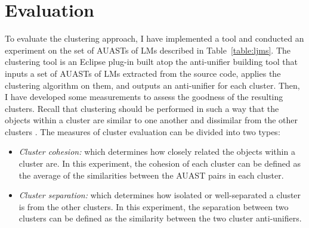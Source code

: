 \section{Evaluation} \label{evaluation}
To evaluate the clustering approach, I have implemented a tool and conducted an experiment on the set of AUASTs of LMs described in Table~\ref{table:ljms}. The clustering tool is an Eclipse plug-in built atop the anti-unifier building tool that inputs a set of AUASTs of LMs extracted from the source code, applies the clustering algorithm on them, and outputs an anti-unifier for each cluster. Then, I have developed some measurements to assess the goodness of the resulting clusters. Recall that clustering should be performed in such a way that the objects within a cluster are similar to one another and dissimilar from the other clusters \cite{tan2013data}. The measures of cluster evaluation can be divided into two types:

\begin{itemize} [leftmargin=0.4in]
\item \emph{Cluster cohesion:} which determines how closely related the objects within a cluster are. In this experiment, the cohesion of each cluster can be defined as the average of the similarities between the AUAST pairs in each cluster.
\item \emph{Cluster separation:} which determines how isolated or well-separated a cluster is from the other clusters. In this experiment, the separation between two clusters can be defined as the similarity between the two cluster anti-unifiers.
\end{itemize}


